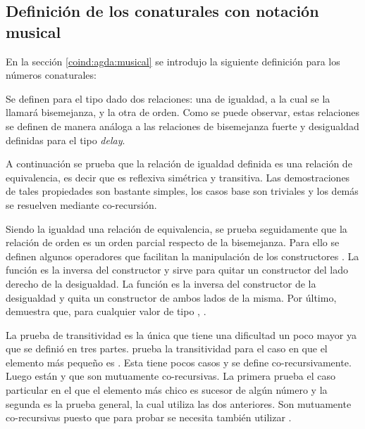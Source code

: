\subsection{Definición de los conaturales con notación musical}\label{casodelay:conat:defmus}

En la sección \ref{coind:agda:musical} se introdujo la siguiente definición para los números conaturales:

Se definen para el tipo dado dos relaciones: una de igualdad, a la cual se la llamará bisemejanza, y la otra de orden. Como se puede observar, estas relaciones se definen de manera análoga a las relaciones de bisemejanza fuerte y desigualdad definidas para el tipo \textit{delay}. 

A continuación se prueba que la relación de igualdad definida es una relación de equivalencia, es decir que es reflexiva simétrica y transitiva. Las demostraciones de tales propiedades son bastante simples, los casos base son triviales y los demás se resuelven mediante co-recursión.

Siendo la igualdad una relación de equivalencia, se prueba seguidamente que la relación de orden es un orden parcial respecto de la bisemejanza. Para ello se definen algunos operadores que facilitan la manipulación de los constructores . La función  es la inversa del constructor  y sirve para quitar un constructor  del lado derecho de la desigualdad. La función  es la inversa del constructor  de la desigualdad y quita un constructor de ambos lados de la misma. Por último,  demuestra que, para cualquier valor  de tipo ,   \AgdaFunction{$\gtrsim$} \AgdaField{$\flat$} .

La prueba de transitividad es la única que tiene una dificultad un poco mayor ya que se definió en tres partes.  prueba la transitividad para el caso en que el elemento más pequeño es . Esta tiene pocos casos y se define co-recursivamente. Luego están  y  que son mutuamente co-recursivas. La primera prueba el caso particular en el que el elemento más chico es sucesor de algún número y la segunda es la prueba general, la cual utiliza las dos anteriores. Son mutuamente co-recursivas puesto que para probar  se necesita también utilizar . 

